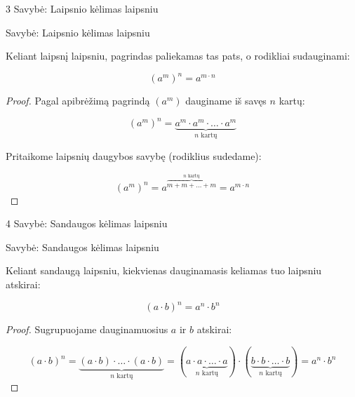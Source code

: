 \documentclass[aspectratio=169,10pt]{beamer}
\newenvironment{property}[1][]%
{\begin{block}{Savybė: #1}}%
{\end{block}}
\begin{document}
\begin{frame}{3 Savybė: Laipsnio kėlimas laipsniu}

    \begin{property}[Laipsnio kėlimas laipsniu]

        Keliant laipsnį laipsniu, pagrindas paliekamas tas pats,
        o rodikliai sudauginami:

        \[
        (a^m)^n=a^{m\cdot n}
        \]

    \end{property}

    \begin{proof}

        Pagal apibrėžimą pagrindą $(a^m)$ dauginame iš savęs
        $n$ kartų:

        \[
        (a^m)^n
        =
        \underbrace{
        a^m\cdot a^m\cdot\dots\cdot a^m
        }_{n\text{ kartų}}
        \]

        Pritaikome laipsnių daugybos savybę
        (rodiklius sudedame):

        \[
        (a^m)^n
        =
        a^{
        \overbrace{
        m+m+\dots+m
        }^{n\text{ kartų}}
        }
        =
        a^{m\cdot n}
        \]

    \end{proof}

\end{frame}


\begin{frame}{4 Savybė: Sandaugos kėlimas laipsniu}

    \begin{property}[Sandaugos kėlimas laipsniu]

        Keliant sandaugą laipsniu, kiekvienas dauginamasis
        keliamas tuo laipsniu atskirai:

        \[
        (a\cdot b)^n=a^n\cdot b^n
        \]

    \end{property}

    \begin{proof}

        Sugrupuojame dauginamuosius $a$ ir $b$ atskirai:

        \[
        (a\cdot b)^n
        =
        \underbrace{
        (a\cdot b)\cdot\dots\cdot(a\cdot b)
        }_{n\text{ kartų}}
        =
        \left(
        \underbrace{
        a\cdot a\cdot\dots\cdot a
        }_{n\text{ kartų}}
        \right)
        \cdot
        \left(
        \underbrace{
        b\cdot b\cdot\dots\cdot b
        }_{n\text{ kartų}}
        \right)
        =
        a^n\cdot b^n
        \]

    \end{proof}

\end{frame}
\end{document}
